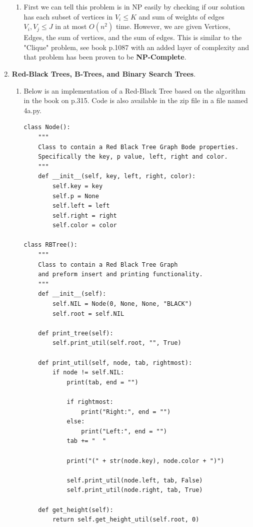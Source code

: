 \documentclass{article}
\begin{document}
\begin{enumerate}
\begin{enumerate}
      \item First we can tell this problem is in NP easily by checking if our solution has each subset of vertices in $V_i \leq K$ and sum of weights of edges $V_i, V_j \leq J$ in at most $O(n^2)$ time. However, we are given Vertices, Edges, the sum of vertices, and the sum of edges.
      This is similar to the "Clique" problem, see book p.1087 with an added layer of complexity and that problem has been proven to be \textbf{NP-Complete}.      
    \end{enumerate}

    \item \textbf{Red-Black Trees, B-Trees, and Binary Search Trees}.
    
    \begin{enumerate}
      \item Below is an implementation of a Red-Black Tree based on the algorithm in the book on p.315. Code is also available in the zip file in a file named 4a.py.
      
      \begin{lstlisting}
class Node():
    """
    Class to contain a Red Black Tree Graph Bode properties.
    Specifically the key, p value, left, right and color. 
    """
    def __init__(self, key, left, right, color):
        self.key = key
        self.p = None
        self.left = left
        self.right = right
        self.color = color

class RBTree():
    """
    Class to contain a Red Black Tree Graph
    and preform insert and printing functionality.
    """
    def __init__(self):
        self.NIL = Node(0, None, None, "BLACK")
        self.root = self.NIL
        
    def print_tree(self):
        self.print_util(self.root, "", True)

    def print_util(self, node, tab, rightmost):
        if node != self.NIL:
            print(tab, end = "")            
            
            if rightmost:
                print("Right:", end = "")
            else:
                print("Left:", end = "")
            tab += "  "
                
            print("(" + str(node.key), node.color + ")")
            
            self.print_util(node.left, tab, False)
            self.print_util(node.right, tab, True)
    
    def get_height(self):
        return self.get_height_util(self.root, 0)
    

\end{lstlisting}
\end{enumerate}
\end{enumerate}
\end{document}

